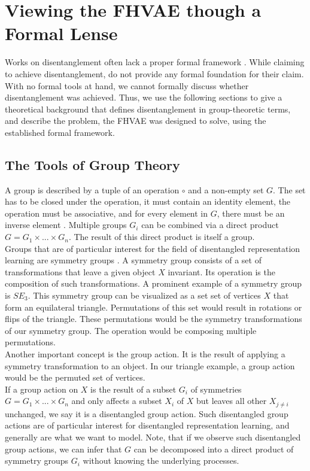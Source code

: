 \documentclass{article} %
\begin{document}
\section*{Viewing the FHVAE though a Formal Lense}
Works on disentanglement often lack a proper formal framework \cite{higgins2018towards}. While claiming to achieve disentanglement, \citet{hsu2017unsupervised} do not provide any formal foundation for their claim. With no formal tools at hand, we cannot formally discuss whether disentanglement was achieved. Thus, we use the following sections to give a theoretical background that defines disentanglement in group-theoretic terms, and describe the problem, the FHVAE was designed to solve, using the established formal framework.



\subsection*{The Tools of Group Theory}
A group is described by a tuple of an operation $\circ$ and a non-empty set $G$. The set has to be closed under the operation, it must contain an identity element, the operation must be associative, and for every element in $G$, there must be an inverse element \cite{benkart1987abstract}.
Multiple groups $G_i$ can be combined via a direct product $G = G_1 \times ... \times G_n$. The result of this direct product is itself a group.\\%
Groups that are of particular interest for the field of disentangled representation learning are symmetry groups \cite{benkart1987abstract}.
A symmetry group consists of a set of transformations that leave a given object $X$ invariant. Its operation is the composition of such transformations. A prominent example of a symmetry group is $SE_3$. This symmetry group can be visualized as a set set of vertices $X$ that form an equilateral triangle. Permutations of this set would result in rotations or flips of the triangle. These permutations would be the symmetry transformations of our symmetry group. The operation would be composing multiple permutations.\\
Another important concept is the group action. It is the result of applying a symmetry transformation to an object. In our triangle example, a group action would be the permuted set of vertices.\\
If a group action on $X$ is the result of a subset $G_i$ of symmetries $G= G_1 \times ... \times G_n$ and only affects a subset $X_i$ of $X$ but leaves all other $X_{j\neq i}$ unchanged, we say it is a disentangled group action. Such disentangled group actions are of particular interest for disentangled representation learning, and generally are what we want to model. Note, that if we observe such disentangled group actions, we can infer that $G$ can be decomposed into a direct product of symmetry groups $G_i$ without knowing the underlying processes.\\
\end{document}
